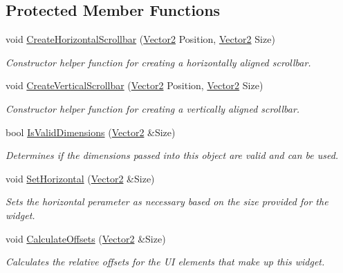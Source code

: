 \subsection*{Protected Member Functions}
\begin{DoxyCompactItemize}
\item 
void \hyperlink{classphys_1_1UI_1_1Scrollbar_a9cdd95f31c579b5f7f8631c9dbe1778b}{CreateHorizontalScrollbar} (\hyperlink{classphys_1_1Vector2}{Vector2} Position, \hyperlink{classphys_1_1Vector2}{Vector2} Size)
\begin{DoxyCompactList}\small\item\em Constructor helper function for creating a horizontally aligned scrollbar. \item\end{DoxyCompactList}\item 
void \hyperlink{classphys_1_1UI_1_1Scrollbar_af691e35d62a74925584482f901696ad4}{CreateVerticalScrollbar} (\hyperlink{classphys_1_1Vector2}{Vector2} Position, \hyperlink{classphys_1_1Vector2}{Vector2} Size)
\begin{DoxyCompactList}\small\item\em Constructor helper function for creating a vertically aligned scrollbar. \item\end{DoxyCompactList}\item 
bool \hyperlink{classphys_1_1UI_1_1Scrollbar_ad2989b3f14f11f7c6ec167377487d8a3}{IsValidDimensions} (\hyperlink{classphys_1_1Vector2}{Vector2} \&Size)
\begin{DoxyCompactList}\small\item\em Determines if the dimensions passed into this object are valid and can be used. \item\end{DoxyCompactList}\item 
void \hyperlink{classphys_1_1UI_1_1Scrollbar_abc3671abd06d152f2db526cb0fd4766d}{SetHorizontal} (\hyperlink{classphys_1_1Vector2}{Vector2} \&Size)
\begin{DoxyCompactList}\small\item\em Sets the horizontal perameter as necessary based on the size provided for the widget. \item\end{DoxyCompactList}\item 
void \hyperlink{classphys_1_1UI_1_1Scrollbar_a8a114e8163e5bb29b97c8c32b55095fc}{CalculateOffsets} (\hyperlink{classphys_1_1Vector2}{Vector2} \&Size)
\begin{DoxyCompactList}\small\item\em Calculates the relative offsets for the UI elements that make up this widget. \item\end{DoxyCompactList}\item 

\end{DoxyCompactItemize}
